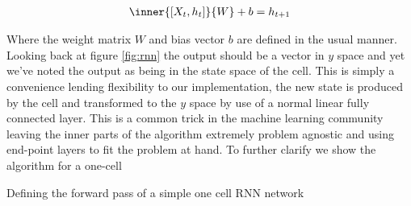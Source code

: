 \begin{align}\label{eq:rnn}
\inner{[X_t, h_t]}{W} + b = h_{t+1}
\end{align}

Where the weight matrix $W$ and bias vector $b$ are defined in the usual manner. Looking back at figure \ref{fig:rnn} the output should be a vector in $y$ space and yet we've noted the output as being in the state space of the cell. This is simply a convenience lending flexibility to our implementation, the new state is produced by the cell and transformed to the $y$ space by use of a normal linear fully connected layer. This is a common trick in the machine learning community leaving the inner parts of the algorithm extremely problem agnostic and using end-point layers to fit the problem at hand. To further clarify we show the algorithm for a one-cell 

\begin{algorithm}[H]
\SetAlgoLined
\caption{Defining the forward pass of a simple one cell RNN network}
\end{algorithm}